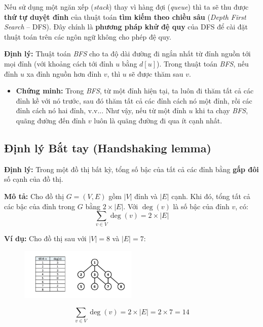 Nếu sử dụng một ngăn xếp (\textit{stack}) thay vì hàng đợi (\textit{queue}) thì ta sẽ thu được \textbf{thứ tự duyệt đỉnh} của thuật toán \textbf{tìm kiếm theo chiều sâu} (\textit{Depth First Search} -- DFS). Đây chính là \textbf{phương pháp khử đệ quy} của DFS để cài đặt thuật toán trên các ngôn ngữ không cho phép đệ quy.

\textbf{Định lý:} Thuật toán \textit{BFS} cho ta độ dài đường đi ngắn nhất từ đỉnh nguồn tới mọi đỉnh (với khoảng cách tới đỉnh $u$ bằng $d[u]$).  
Trong thuật toán \textit{BFS}, nếu đỉnh $u$ xa đỉnh nguồn hơn đỉnh $v$, thì $u$ sẽ được thăm sau $v$.

\begin{itemize}
    \item \textbf{Chứng minh:} Trong \textit{BFS}, từ một đỉnh hiện tại, ta luôn đi thăm tất cả các đỉnh kề với nó trước, sau đó thăm tất cả các đỉnh cách nó một đỉnh, rồi các đỉnh cách nó hai đỉnh, v.v... Như vậy, nếu từ một đỉnh $u$ khi ta chạy \textit{BFS}, quãng đường đến đỉnh $v$ luôn là quãng đường đi qua ít cạnh nhất.
\end{itemize}

\subsection{Định lý Bắt tay (Handshaking lemma)}

\textbf{Định lý:} Trong một đồ thị bất kỳ, tổng số bậc của tất cả các đỉnh bằng \textbf{gấp đôi} số cạnh của đồ thị.

\textbf{Mô tả:} Cho đồ thị $G = (V, E)$ gồm $|V|$ đỉnh và $|E|$ cạnh. Khi đó, tổng tất cả các bậc của đỉnh trong $G$ bằng $2 \times |E|$.  
Với $\deg(v)$ là số bậc của đỉnh $v$, có:
\[
\sum_{v \in V} \deg(v) = 2 \times |E|
\]

\textbf{Ví dụ:} Cho đồ thị sau với $|V| = 8$ và $|E| = 7$:

\begin{figure}[h]   
    \centering
    \includegraphics[width=0.5\textwidth]{resource/img/b6/breadth-first-search_img5.png}
\end{figure}

\[
\sum_{v \in V} \deg(v) = 2 \times |E| = 2 \times 7 = 14
\]

